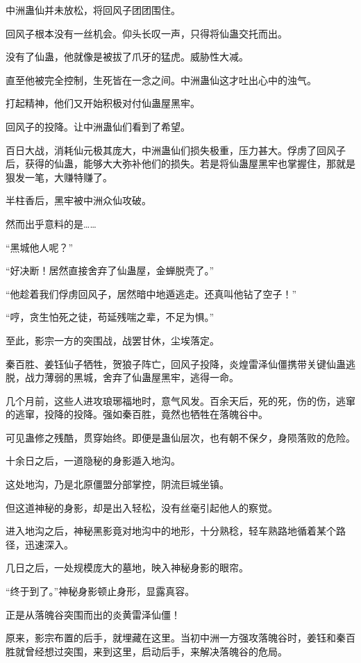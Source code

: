 \begin{this_body}
中洲蛊仙并未放松，将回风子团团围住。

回风子根本没有一丝机会。仰头长叹一声，只得将仙蛊交托而出。

没有了仙蛊，他就像是被拔了爪牙的猛虎。威胁性大减。

直至他被完全控制，生死皆在一念之间。中洲蛊仙这才吐出心中的浊气。

打起精神，他们又开始积极对付仙蛊屋黑牢。

回风子的投降。让中洲蛊仙们看到了希望。

百日大战，消耗仙元极其庞大，中洲蛊仙们损失极重，压力甚大。俘虏了回风子后，获得的仙蛊，能够大大弥补他们的损失。若是将仙蛊屋黑牢也掌握住，那就是狠发一笔，大赚特赚了。

半柱香后，黑牢被中洲众仙攻破。

然而出乎意料的是……

“黑城他人呢？”

“好决断！居然直接舍弃了仙蛊屋，金蝉脱壳了。”

“他趁着我们俘虏回风子，居然暗中地遁逃走。还真叫他钻了空子！”

“哼，贪生怕死之徒，苟延残喘之辈，不足为惧。”

至此，影宗一方的突围战，战罢甘休，尘埃落定。

秦百胜、姜钰仙子牺牲，贺狼子阵亡，回风子投降，炎煌雷泽仙僵携带关键仙蛊逃脱，战力薄弱的黑城，舍弃了仙蛊屋黑牢，逃得一命。

几个月前，这些人进攻琅琊福地时，意气风发。百余天后，死的死，伤的伤，逃窜的逃窜，投降的投降。强如秦百胜，竟然也牺牲在落魄谷中。

可见蛊修之残酷，贯穿始终。即便是蛊仙层次，也有朝不保夕，身陨落败的危险。

十余日之后，一道隐秘的身影遁入地沟。

这处地沟，乃是北原僵盟分部掌控，阴流巨城坐镇。

但这道神秘的身影，却是出入轻松，没有丝毫引起他人的察觉。

进入地沟之后，神秘黑影竟对地沟中的地形，十分熟稔，轻车熟路地循着某个路径，迅速深入。

几日之后，一处规模庞大的墓地，映入神秘身影的眼帘。

“终于到了。”神秘身影顿止身形，显露真容。

正是从落魄谷突围而出的炎黄雷泽仙僵！

原来，影宗布置的后手，就埋藏在这里。当初中洲一方强攻落魄谷时，姜钰和秦百胜就曾经想过突围，来到这里，启动后手，来解决落魄谷的危局。


\end{this_body}
